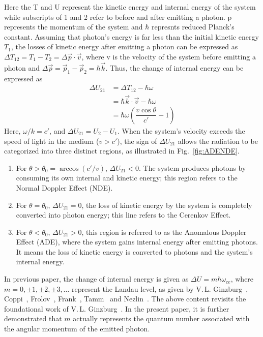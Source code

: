 \documentclass{cpbtex3}
\begin{document}
Here the T and U represent the kinetic energy and internal energy of the system while subscripts of 1 and 2 refer to before and after emitting a photon. p represents the momentum of the system and $\hbar$ represnts reduced Planck's constant. Assuming that photon’s energy is far less than the initial kinetic energy $T_1$, the losses of kinetic energy after emitting a photon can be expressed as $\Delta T_{12} = T_1 - T_2 = \Delta\vec{ p} \cdot \vec{v}$, where v is the velocity of the system before emitting a photon and $\Delta\vec{ p} = \vec{p}_1 - \vec{p}_2 = \hbar \vec{k}$. Thus, the change of internal energy can be expressed as 
\begin{equation} 
\begin{array}{rl}
\Delta U_{21} &= \Delta T_{12} - \hbar \omega \\
              &= \hbar \vec{k} \cdot \vec{v} - \hbar \omega \\
              &= \hbar \omega \left( \dfrac{v \cos \theta}{c'} - 1 \right)
\end{array} \label{eq:DeltaU00}
\end{equation}
Here, \(\omega / k = c'\), and \(\Delta U_{21} = U_2 - U_1\). When the system's velocity exceeds the speed of light in the medium (\(v > c'\)), the sign of \(\Delta U_{21}\) allows the radiation to be categorized into three distinct regions, as illustrated in Fig.~\ref{fig:ADENDE}.
\begin{enumerate}
\item For $\theta > \theta_0 = \arccos(c'/v)$, $\Delta U_{21} < 0$. The system produces photons by consuming its own internal and kinetic energy; this region refers to the Normal Doppler Effect (NDE).
\item For $\theta = \theta_0$, $\Delta U_{21} = 0$, the loss of kinetic energy by the system is completely converted into photon energy; this line refers to the Cerenkov Effect.
\item For $\theta < \theta_0$, $\Delta U_{21} > 0$, this region is referred to as the Anomalous Doppler Effect (ADE), where the system gains internal energy after emitting photons. It means the loss of kinetic energy is converted to photons and the system's internal energy.
\end{enumerate}
In previous paper, the change of internal energy is given as $\Delta U = m\hbar\omega_{ce}$, where $m = 0, \pm1, \pm2, \pm3, \ldots$ represent the Landau level, as given by V.\,L. Ginzburg~\cite{ginzburg2005radiation}, Coppi~\cite{coppi1976slide}, Frolov~\cite{frolov1986excitation}, Frank~\cite{frank1960optics}, Tamm~\cite{tamm1959general} and Nezlin~\cite{nezlin1976negative}. The above content revisits the foundational work of V.\,L. Ginzburg~\cite{ginzburg2005radiation}. In the present paper, it is further demonstrated that $m$ actually represents the quantum number associated with the angular momentum of the emitted photon.
\end{document}
